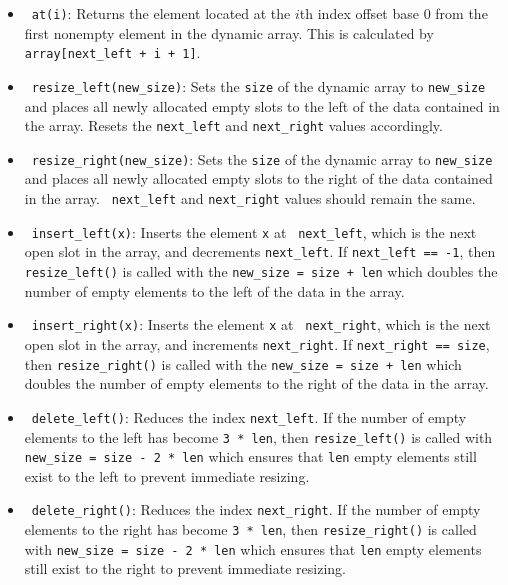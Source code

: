 \documentclass[12pt,twoside]{article}
\begin{document}
\begin{problems}
    \begin{itemize}
        \item \ {\tt at(i)}: Returns the element located at the $ i $th index
            offset base $ 0 $ from the first nonempty element in the dynamic
            array. This is calculated by {\tt array[next\_left + i + 1]}.
        \item \ {\tt resize\_left(new\_size)}: Sets the {\tt size} of the
            dynamic array to {\tt new\_size} and places all newly allocated
            empty slots to the left of the data contained in the array.
            Resets the {\tt next\_left} and {\tt next\_right} values
            accordingly.
        \item \ {\tt resize\_right(new\_size)}: Sets the {\tt size} of the
            dynamic array to {\tt new\_size} and places all newly allocated
            empty slots to the right of the data contained in the array. {\tt
            next\_left} and {\tt next\_right} values should remain the same.
        \item \ {\tt insert\_left(x)}: Inserts the element {\tt x} at {\tt
            next\_left}, which is the next open slot in the array, and
            decrements {\tt next\_left}. If {\tt next\_left == -1}, then {\tt
            resize\_left()} is called with the {\tt new\_size = size + len}
            which doubles the number of empty elements to the left of the
            data in the array.
        \item \ {\tt insert\_right(x)}: Inserts the element {\tt x} at {\tt
            next\_right}, which is the next open slot in the array, and
            increments {\tt next\_right}. If {\tt next\_right == size}, then
            {\tt resize\_right()} is called with the {\tt new\_size = size +
            len} which doubles the number of empty elements to the right of
            the data in the array.
        \item \ {\tt delete\_left()}: Reduces the index {\tt next\_left}. If
            the number of empty elements to the left has become {\tt 3 *
            len}, then {\tt resize\_left()} is called with {\tt new\_size =
            size - 2 * len} which ensures that {\tt len} empty elements still
            exist to the left to prevent immediate resizing.
        \item \ {\tt delete\_right()}: Reduces the index {\tt next\_right}. If
            the number of empty elements to the right has become {\tt 3 *
            len}, then {\tt resize\_right()} is called with {\tt new\_size =
            size - 2 * len} which ensures that {\tt len} empty elements still
            exist to the right to prevent immediate resizing.
    \end{itemize}


\end{problems}
\end{document}

